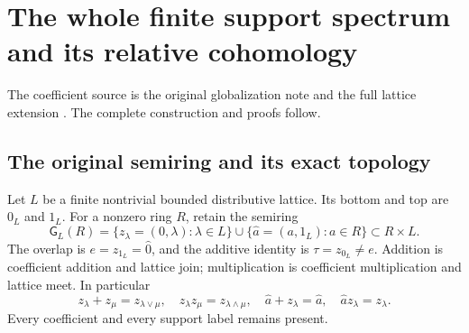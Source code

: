 \documentclass[11pt,a4paper]{article}
\theoremstyle{definition}\newtheorem{definition}[theorem]{Definition}
\newcommand{\G}{\mathsf G}\newcommand{\Tor}{\operatorname{Tor}}\newcommand{\Frac}{\operatorname{Frac}}
\begin{document}
\section{The whole finite support spectrum and its relative cohomology}
\label{sec:full-finite-support}
The coefficient source is the original globalization note and the full lattice extension \cite{globalization,support}. The complete construction and proofs follow.
\subsection{The original semiring and its exact topology}

Let $L$ be a finite nontrivial bounded distributive lattice. Its bottom
and top are $0_L$ and $1_L$. For a nonzero ring $R$, retain the semiring
\[
 \G_L(R)=\{z_\lambda=(0,\lambda):\lambda\in L\}
     \cup\{\widehat a=(a,1_L):a\in R\}\subset R\times L.
 \tag{FL1}\label{FL:eq:semiring}
\]
The overlap is $e=z_{1_L}=\widehat0$, and the additive identity is
$\tau=z_{0_L}\ne e$. Addition is coefficient addition and lattice
join; multiplication is coefficient multiplication and lattice meet.
In particular
\[
 z_\lambda+z_\mu=z_{\lambda\vee\mu},\quad
 z_\lambda z_\mu=z_{\lambda\wedge\mu},\quad
 \widehat a+z_\lambda=\widehat a,\quad
 \widehat a z_\lambda=z_\lambda.
 \tag{FL2}\label{FL:eq:operations}
\]
Every coefficient and every support label remains present.
\end{document}
